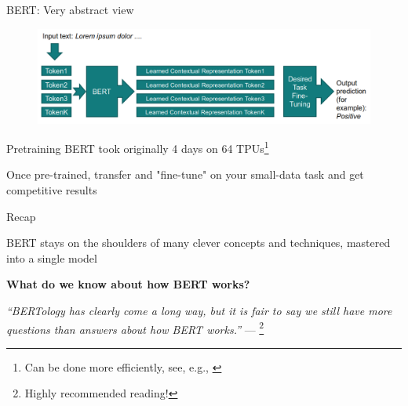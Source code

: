 \documentclass[12pt,aspectratio=169,handout]{beamer}
\begin{document}
\begin{frame}{BERT: Very abstract view}
	
	\begin{figure}
		\includegraphics[width=\linewidth]{img/bert1.png}
	\end{figure}	
	
	Pretraining BERT took originally 4 days on 64 TPUs\footnote{Can be done more efficiently, see, e.g., \citet{izsak-etal-2021-train}}
	
	\bigskip
	
	Once pre-trained, transfer and "fine-tune" on your small-data task and get competitive results


	

	
\end{frame}


\begin{frame}{Recap}
	
	BERT stays on the shoulders of many clever concepts and techniques, mastered into a single model
	
\textbf{What do we know about how BERT works?}

	
\emph{``BERTology has clearly come a long way, but it is fair to say we still have more questions than answers about how BERT works.''} --- \citet{Rogers.et.al.2020.BERT}\footnote{Highly recommended reading!}
	
	
	
\end{frame}


\fi
\end{document}
